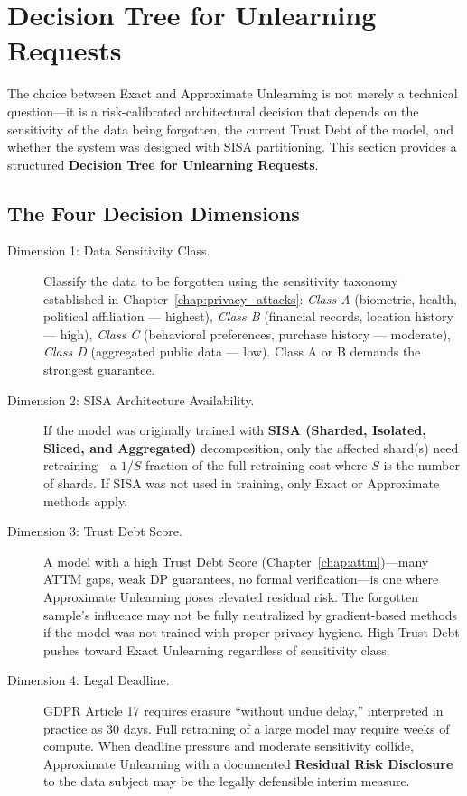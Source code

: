 \section{Decision Tree for Unlearning Requests}
\label{sec:unlearning_decision_tree}

The choice between Exact and Approximate Unlearning is not merely a technical question---it is a risk-calibrated architectural decision that depends on the sensitivity of the data being forgotten, the current Trust Debt of the model, and whether the system was designed with SISA partitioning. This section provides a structured \textbf{Decision Tree for Unlearning Requests}.

\subsection{The Four Decision Dimensions}
\label{sec:unlearning_dimensions}

\begin{description}
  \item[Dimension 1: Data Sensitivity Class.]
    Classify the data to be forgotten using the sensitivity taxonomy established in Chapter~\ref{chap:privacy_attacks}: \textit{Class A} (biometric, health, political affiliation --- highest), \textit{Class B} (financial records, location history --- high), \textit{Class C} (behavioral preferences, purchase history --- moderate), \textit{Class D} (aggregated public data --- low). Class A or B demands the strongest guarantee.

  \item[Dimension 2: SISA Architecture Availability.]
    If the model was originally trained with \textbf{SISA (Sharded, Isolated, Sliced, and Aggregated)} decomposition, only the affected shard(s) need retraining---a $1/S$ fraction of the full retraining cost where $S$ is the number of shards. If SISA was not used in training, only Exact or Approximate methods apply.

  \item[Dimension 3: Trust Debt Score.]
    A model with a high Trust Debt Score (Chapter~\ref{chap:attm})---many ATTM gaps, weak DP guarantees, no formal verification---is one where Approximate Unlearning poses elevated residual risk. The forgotten sample's influence may not be fully neutralized by gradient-based methods if the model was not trained with proper privacy hygiene. High Trust Debt pushes toward Exact Unlearning regardless of sensitivity class.

  \item[Dimension 4: Legal Deadline.]
    GDPR Article 17 requires erasure ``without undue delay,'' interpreted in practice as 30 days. Full retraining of a large model may require weeks of compute. When deadline pressure and moderate sensitivity collide, Approximate Unlearning with a documented \textbf{Residual Risk Disclosure} to the data subject may be the legally defensible interim measure.
\end{description}

